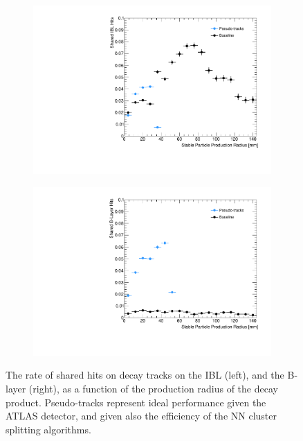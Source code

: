 \begin{figure}[!htbp]
    \centering
    \begin{subfigure}{.48\textwidth}
      \centering
      \includegraphics[width=\textwidth]{chapters/3.tracking/figs/po_nSharedOnIBL_From_B_DL.pdf}
    \end{subfigure}%
    \begin{subfigure}{.48\textwidth}
      \centering
      \includegraphics[width=\textwidth]{chapters/3.tracking/figs/po_nSharedOnBL_From_B_DL.pdf}
    \end{subfigure}
    \caption{
      The rate of shared hits on \bhadron decay tracks on the IBL (left), and the B-layer (right), as a function of the production radius of the \bhadron decay product. 
      Pseudo-tracks represent ideal performance given the ATLAS detector, and given also the efficiency of the NN cluster splitting algorithms.
    }
    \label{fig:shared_hits_pseudo}
\end{figure}



